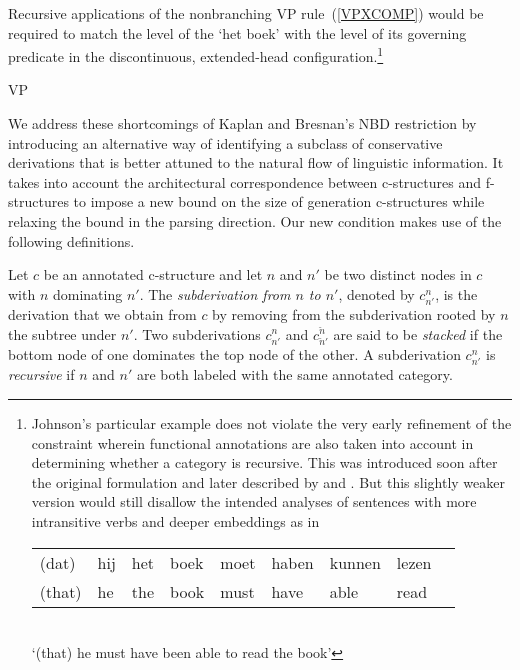 \documentclass[output=paper,hidelinks]{langscibook}
\begin{document}
\noindent Recursive applications of the nonbranching  VP rule~(\ref{VPXCOMP}) would be required to match the level of the  `het boek' with the level of its governing predicate %
in the discontinuous, extended-head configuration.\footnote{Johnson's particular example does not violate the very early refinement of the constraint wherein functional annotations are also taken into account in determining whether a category is recursive. This was introduced soon after the original formulation and later described by \citet{kaplanmaxwell96} and \cite{dalrymple01}. But this slightly weaker version would still disallow the intended analyses of sentences with more intransitive verbs and deeper  embeddings as in\\[1ex]
\hsp{2em}  
      \begin{tabular}[t]{@{}lllllllll}
                 (dat) & hij & het &  boek &moet &  haben & kunnen & lezen\\
                  (that)&  he& the & book & must & have &able& read
       \end{tabular}\\
\hsp{2em} `(that) he must have been able to read the book'
}

\ea\label{VPXCOMP}
\small  VP \rarrow {}
 \z

We address these shortcomings of Kaplan and Bresnan's NBD restriction by introducing an alternative way of identifying a subclass of conservative derivations that is better attuned to the natural flow of linguistic information. It takes into account the architectural correspondence between c-structures and f-structures to impose a new bound on the size of generation c-structures while relaxing the bound in the parsing direction.  Our new condition makes use of the following definitions.

Let $c$ be an annotated c-structure and let $n$ and $n'$ be two distinct nodes in $c$ with $n$ dominating $n'$. The \textit{subderivation from $n$  to  $n'$}, denoted by $c^n_{n'}$, is the derivation that we obtain from $c$ by removing from the subderivation rooted by $n$ the subtree under $n'$. Two subderivations $c^n_{n'}$  and $c^{\check{n}}_{\check{n}'}$ are said to be \textit{stacked} if the bottom node of one dominates the top node of the other. A subderivation $c^n_{n'}$ is \textit{recursive} if $n$ and $n'$ are both labeled with the same annotated category.
\end{document}
